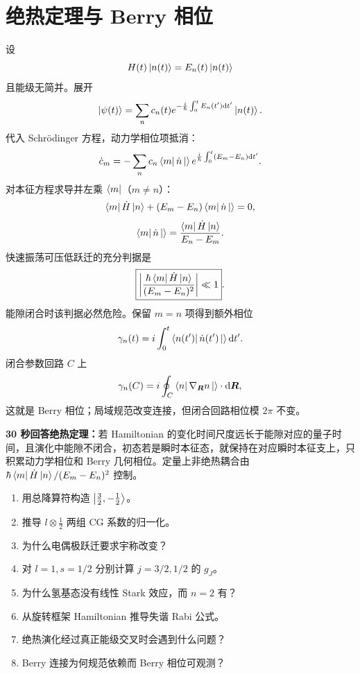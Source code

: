 \section{绝热定理与 Berry 相位}
设
\[
H(t)\left|n(t)\right\rangle=E_n(t)\left|n(t)\right\rangle
\]
且能级无简并。展开
\[
\left|\psi(t)\right\rangle
=\sum_n c_n(t)e^{-\frac{i}{\hbar}\int_0^tE_n(t')\mathrm d t'}\left|n(t)\right\rangle.
\]
代入 Schrödinger 方程，动力学相位项抵消：
\[
\dot c_m=-\sum_n c_n\left\langle m\right|\dot n\left|\right\rangle
e^{\frac{i}{\hbar}\int_0^t(E_m-E_n)\mathrm d t'}.
\]
对本征方程求导并左乘 $\left\langle m\right|$（$m\ne n$）：
\[
\left\langle m\right|\dot H\left|n\right\rangle+(E_m-E_n)\left\langle m\right|\dot n\left|\right\rangle=0,
\]
\[
\left\langle m\right|\dot n\left|\right\rangle=\frac{\left\langle m\right|\dot H\left|n\right\rangle}{E_n-E_m}.
\]
快速振荡可压低跃迁的充分判据是
\[
\boxed{
\left|\frac{\hbar\left\langle m\right|\dot H\left|n\right\rangle}{(E_m-E_n)^2}\right|\ll1}.
\]
能隙闭合时该判据必然危险。保留 $m=n$ 项得到额外相位
\[
\gamma_n(t)=i\int_0^t\left\langle n(t')\right|\dot n(t')\left|\right\rangle\mathrm d t'.
\]
闭合参数回路 $C$ 上
\[
\gamma_n(C)=i\oint_C\left\langle n\right|\nabla_{\bm{R}}n\left|\right\rangle\cdot\mathrm d\bm{R},
\]
这就是 Berry 相位；局域规范改变连接，但闭合回路相位模 $2\pi$ 不变。

\begin{interviewbox}
\textbf{30 秒回答绝热定理：}若 Hamiltonian 的变化时间尺度远长于能隙对应的量子时间，且演化中能隙不闭合，初态若是瞬时本征态，就保持在对应瞬时本征支上，只积累动力学相位和 Berry 几何相位。定量上非绝热耦合由
$\hbar\left\langle m\right|\dot H\left|n\right\rangle/(E_m-E_n)^2$ 控制。
\end{interviewbox}

\begin{selftestbox}
\begin{enumerate}
\item 用总降算符构造 $\left|\frac32,-\frac12\right\rangle$。
\item 推导 $l\otimes\frac12$ 两组 CG 系数的归一化。
\item 为什么电偶极跃迁要求宇称改变？
\item 对 $l=1,s=1/2$ 分别计算 $j=3/2,1/2$ 的 $g_J$。
\item 为什么氢基态没有线性 Stark 效应，而 $n=2$ 有？
\item 从旋转框架 Hamiltonian 推导失谐 Rabi 公式。
\item 绝热演化经过真正能级交叉时会遇到什么问题？
\item Berry 连接为何规范依赖而 Berry 相位可观测？
\end{enumerate}
\end{selftestbox}
